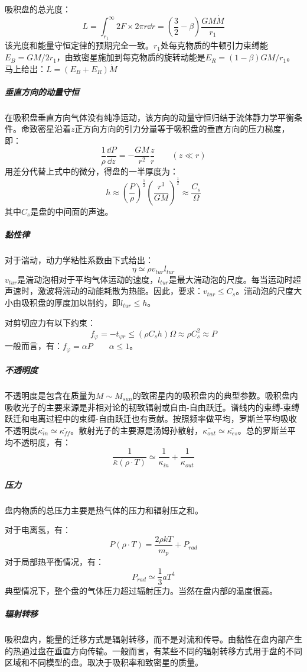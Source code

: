 吸积盘的总光度：
\begin{equation}
	L=\int_{r_{1}}^{\infty}2F\times 2\pi r\dd r=\left(\frac{3}{2}-\beta\right)\frac{GM\dot{M}}{r_{1}}
\end{equation}
该光度和能量守恒定律的预期完全一致。$r_{1}$处每克物质的牛顿引力束缚能$E_{B}=GM/2r_{1}$，由致密星施加到每克物质的旋转动能是$E_{R}=(1-\beta)GM/r_{1}$。马上给出：$L=\left(E_{B}+E_{R}\right)\dot{M}$
\subparagraph{垂直方向的动量守恒}在吸积盘垂直方向气体没有纯净运动，该方向的动量守恒归结于流体静力学平衡条件。命致密星沿着$z$正方向方向的引力分量等于吸积盘的垂直方向的压力梯度，即：
\begin{equation}
	\frac{1}{\rho}\frac{\dd P}{\dd z}=-\frac{GM}{r^2}\frac{z}{r}\qquad\left(z\ll r\right)
\end{equation}
用差分代替上式中的微分，得盘的一半厚度为：
\begin{equation}
	h\approx\left(\frac{P}{\rho}\right)^{\frac{1}{2}}\left(\frac{r^3}{GM}\right)^{\frac{1}{2}}\approx\frac{C_{s}}{\Omega}
\end{equation}
其中$C_{s}$是盘的中间面的声速。
\subparagraph{黏性律}对于湍动，动力学粘性系数由下式给出：
\begin{equation}
	\eta\simeq\rho v_{tur}l_{tur}
\end{equation}
$v_{tur}$是湍动泡相对于平均气体运动的速度，$l_{tur}$是最大湍动泡的尺度。每当运动时超声速时，激波将湍动的动能耗散为热能。因此，要求：$v_{tur}\leq C_{s}$。湍动泡的尺度大小由吸积盘的厚度加以制约，即$l_{tur}\leq h$。

对剪切应力有以下约束：
\begin{equation}
	f_{\varphi}=-t_{\varphi r}\leq (\rho C_{s}h)\Omega\approx \rho C_{s}^2\approx P
\end{equation}
一般而言，有：$f_{\varphi}=\alpha P\qquad \alpha\leq 1$。

\subparagraph{不透明度}不透明度是包含在质量为$M\sim M_{sun}$的致密星内的吸积盘内的典型参数。吸积盘内吸收光子的主要来源是非相对论的韧致辐射或自由-自由跃迁。谱线内的束缚-束缚跃迁和电离过程中的束缚-自由跃迁也有贡献。按照频率做平均，罗斯兰平均吸收不透明度$\bar{\kappa_{in}}\simeq\bar{\kappa_{ff}}$。散射光子的主要源是汤姆孙散射，$\bar{\kappa_{out}}\simeq\bar{\kappa_{es}}$。总的罗斯兰平均不透明度，有：
\begin{equation}
	\frac{1}{\bar{\kappa}(\rho\cdot T)}\simeq\frac{1}{\kappa_{in}}+\frac{1}{\kappa_{out}}
\end{equation}
\subparagraph{压力}盘内物质的总压力主要是热气体的压力和辐射压之和。

对于电离氢，有：
\begin{equation}
	P(\rho\cdot T)=\frac{2\rho kT}{m_{p}}+P_{rad}
\end{equation}
对于局部热平衡情况，有：
\begin{equation}
	P_{rad}\simeq\frac{1}{3}aT^4
\end{equation}
典型情况下，整个盘的气体压力超过辐射压力。当然在盘内部的温度很高。
\subparagraph{辐射转移}吸积盘内，能量的迁移方式是辐射转移，而不是对流和传导。由黏性在盘内部产生的热通过盘在垂直方向传输。一般而言，有某些不同的辐射转移方式用于盘的不同区域和不同模型的盘。取决于吸积率和致密星的质量。

